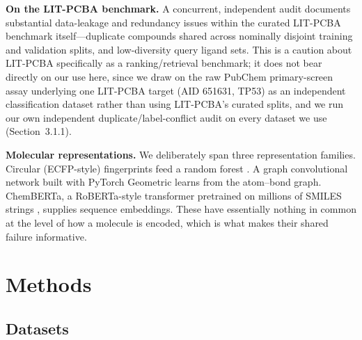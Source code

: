 \documentclass[11pt]{article}
\begin{document}
\textbf{On the LIT-PCBA benchmark.} A concurrent, independent audit \cite{huang2025} documents
substantial data-leakage and redundancy issues within the curated LIT-PCBA benchmark
\cite{tran2020} itself---duplicate compounds shared across nominally disjoint training and
validation splits, and low-diversity query ligand sets. This is a caution about LIT-PCBA
specifically as a ranking/retrieval benchmark; it does not bear directly on our use here, since we
draw on the raw PubChem primary-screen assay underlying one LIT-PCBA target (AID 651631, TP53) as
an independent classification dataset rather than using LIT-PCBA's curated splits, and we run our
own independent duplicate/label-conflict audit on every dataset we use (Section~3.1.1).

\textbf{Molecular representations.} We deliberately span three representation families. Circular
(ECFP-style) fingerprints \cite{rogers2010} feed a random forest \cite{breiman2001}. A graph
convolutional network \cite{kipf2017} built with PyTorch Geometric \cite{fey2019} learns from the
atom--bond graph. ChemBERTa, a RoBERTa-style transformer pretrained on millions of SMILES strings
\cite{chithrananda2020}, supplies sequence embeddings. These have essentially nothing in common at
the level of how a molecule is encoded, which is what makes their shared failure informative.

\section{Methods}

\subsection{Datasets}
\end{document}
